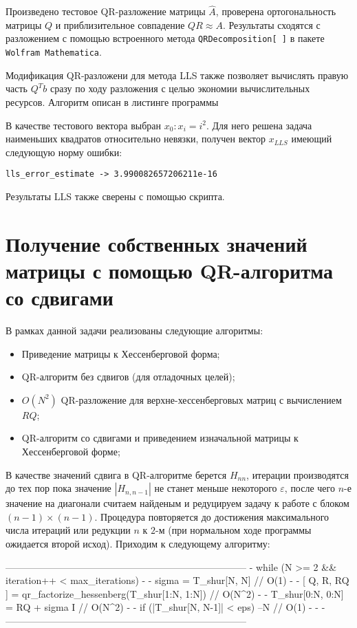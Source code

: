 \documentclass[a4paper,14pt]{extarticle}
\newenvironment{smallverbatim}%
{\small\verbatim}%
{\endverbatim}
\renewcommand{\epsilon}{\varepsilon}
\begin{document}
Произведено тестовое QR-разложение матрицы $\hat{A}$, проверена ортогональность матрицы $Q$ и приблизительное совпадение $QR \approx A$. Результаты сходятся с разложением с помощью встроенного метода \texttt{QRDecomposition[ ]} в пакете \texttt{Wolfram Mathematica}.

Модификация QR-разложени для метода LLS также позволяет вычислять правую часть $Q^T b$ сразу по ходу разложения с целью экономии вычислительных ресурсов. Алгоритм описан в листинге программы

В качестве тестового вектора выбран $x_0: x_i = i^2$. Для него решена задача наименьших квадратов относительно невязки, получен вектор $x_{LLS}$ имеющий следующую норму ошибки:
\begin{verbatim}
lls_error_estimate -> 3.990082657206211e-16
\end{verbatim}

Результаты LLS также сверены с помощью скрипта.

\section{Получение собственных значений матрицы с помощью QR-алгоритма со сдвигами}

В рамках данной задачи реализованы следующие алгоритмы:
\begin{itemize}
\item Приведение матрицы к Хессенберговой форма;

\item QR-алгоритм без сдвигов (для отладочных целей);

\item $O(N^2)$ QR-разложение для верхне-хессенберговых матриц с вычислением $RQ$;

\item QR-алгоритм со сдвигами и приведением изначальной матрицы к Хессенберговой форме;
\end{itemize}

В качестве значений сдвига в QR-алгоритме берется $H_{nn}$, итерации производятся до тех пор пока значение $|H_{n, n-1}|$ не станет меньше некоторого $\epsilon$, после чего $n$-е значение на диагонали считаем найденым и редуцируем задачу к работе с блоком $(n - 1) \times (n - 1)$. Процедура повторяется до достижения максимального числа итераций или редукции $n$ к $2$-м (при нормальном ходе программы ожидается второй исход). Приходим к следующему алгоритму:

\begin{smallverbatim}
---------------------------------------------------------------------------
-   while (N >= 2 && iteration++ < max_iterations) {                      -
-      sigma = T_shur[N, N]                                     // O(1)   -
-      [ Q, R, RQ ] = qr_factorize_hessenberg(T_shur[1:N, 1:N]) // O(N^2) -
-      T_shur[0:N, 0:N] = RQ + sigma I                          // O(N^2) -
-      if (|T_shur[N, N-1]| < eps) --N                          // O(1)   -
-   }                                                                     -
---------------------------------------------------------------------------
\end{smallverbatim}
\end{document}
